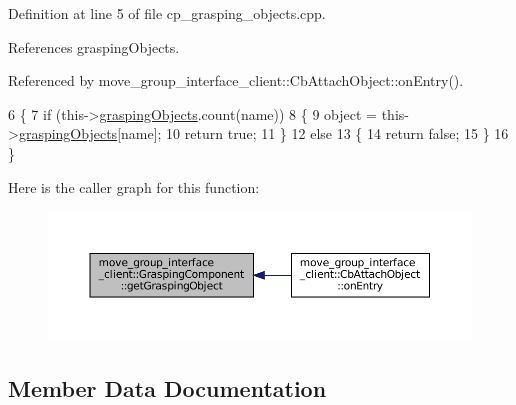 Definition at line 5 of file cp\+\_\+grasping\+\_\+objects.\+cpp.



References grasping\+Objects.



Referenced by move\+\_\+group\+\_\+interface\+\_\+client\+::\+Cb\+Attach\+Object\+::on\+Entry().


\begin{DoxyCode}
6    \{
7       \textcolor{keywordflow}{if} (this->\hyperlink{classmove__group__interface__client_1_1GraspingComponent_aeed40e6ade0536714390acd6a8a2a366}{graspingObjects}.count(name))
8       \{
9          \textcolor{keywordtype}{object} = this->\hyperlink{classmove__group__interface__client_1_1GraspingComponent_aeed40e6ade0536714390acd6a8a2a366}{graspingObjects}[name];
10          \textcolor{keywordflow}{return} \textcolor{keyword}{true};
11       \}
12       \textcolor{keywordflow}{else}
13       \{
14          \textcolor{keywordflow}{return} \textcolor{keyword}{false};
15       \}
16    \}
\end{DoxyCode}
Here is the caller graph for this function\+:
\nopagebreak
\begin{figure}[H]
\begin{center}
\leavevmode
\includegraphics[width=350pt]{classmove__group__interface__client_1_1GraspingComponent_ad3b8583ead160cf3fca89809c9880f1e_icgraph}
\end{center}
\end{figure}


\subsection{Member Data Documentation}
\mbox{\label{classmove__group__interface__client_1_1GraspingComponent_aa1098467cb6a739228c3ed1a3f66c095}} 
